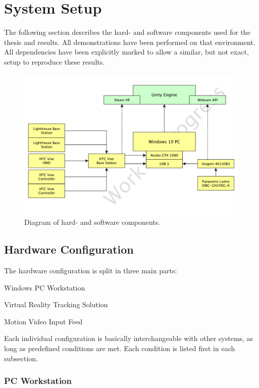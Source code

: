 %
\chapter{System Setup}
\label{sec:system-setup}

The following section describes the hard- and software components used for the 
thesis and results. All demonstrations have been performed on that environment. 
All dependencies have been explicitly marked to allow a similar, but not exact, 
setup to reproduce these results.

\begin{figure}[htb]
	\includegraphics[width=\textwidth]{gfx/System-Components}
	\caption{Diagram of hard- and software components.}
\end{figure}

\section{Hardware Configuration}

The hardware configuration is split in three main parts:
\begin{my_list}
	\item Windows PC Workstation
	\item Virtual Reality Tracking Solution
	\item Motion Video Input Feed
\end{my_list}

Each individual configuration is basically interchangeable with other systems, 
as long as predefined conditions are met. Each condition is listed first in 
each subsection.

\subsection{PC Workstation}

